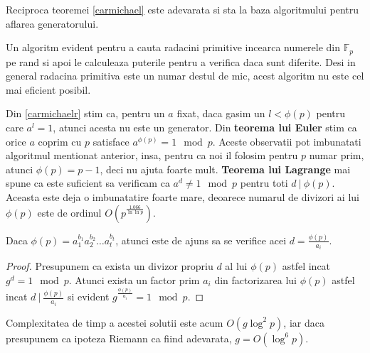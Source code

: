 \begin{thm}
  \label{carmichaelr}
  Reciproca teoremei \ref{carmichael} este adevarata si sta la baza algoritmului pentru aflarea generatorului.
\end{thm}

Un algoritm evident pentru a cauta radacini primitive incearca numerele din $\mathbb{F}_{p}$ pe rand si apoi le calculeaza
puterile pentru a verifica daca sunt diferite. Desi in general radacina primitiva este un numar destul de mic, acest algoritm
nu este cel mai eficient posibil.

Din \ref{carmichaelr} stim ca, pentru un $a$ fixat, daca gasim un $l < \phi(p)$ pentru care $a^{l} = 1$, atunci acesta nu este un
generator. Din \textbf{teorema lui Euler} stim ca orice $a$ coprim cu $p$ satisface $a^{\phi(p)} = 1 \mod p$. Aceste observatii pot
imbunatati algoritmul mentionat anterior, insa, pentru ca noi il folosim pentru $p$ numar prim, atunci $\phi(p) = p - 1$, deci nu
ajuta foarte mult. \textbf{Teorema lui Lagrange} mai spune ca este suficient sa verificam ca $a^{d} \neq 1 \mod p$ pentru toti $d \ |\ \phi(p)$.
Aceasta este deja o imbunatatire foarte mare, deoarece numarul de divizori ai lui $\phi(p)$ este de ordinul $O(p^{\frac{1.066}{\ln \ln p}})$.

Daca $\phi(p) = a_{1}^{b_{1}} a_{2}^{b_{2}} \ldots a_{t}^{b_{t}}$, atunci este de ajuns sa se verifice acei $d = \frac{\phi(p)}{a_{i}}$.

\begin{proof}
  Presupunem ca exista un divizor propriu $d$ al lui $\phi(p)$ astfel incat $g^{d} = 1 \mod p$. Atunci exista un factor prim $a_{i}$
  din factorizarea lui $\phi(p)$ astfel incat $d \ | \ \frac{\phi(p)}{a_{i}}$ si evident $g^{\frac{\phi(p)}{a_{i}}} = 1 \mod p$.
\end{proof}

Complexitatea de timp a acestei solutii este acum $O(g \log^{2} p)$, iar daca presupunem ca ipoteza Riemann ca fiind adevarata, $g = O(\log^{6} p)$.

